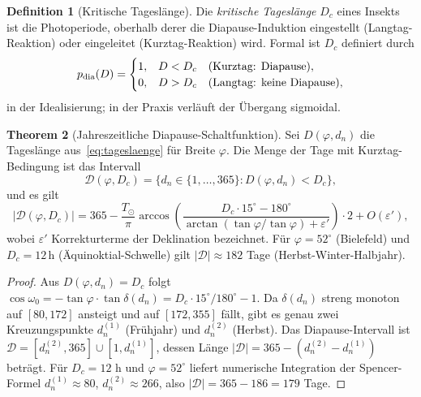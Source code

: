 ﻿\documentclass[12pt, a4paper]{article}
\theoremstyle{definition}
\newtheorem{theorem}{Theorem}[section]
\newtheorem{definition}[theorem]{Definition}
\begin{document}
\begin{definition}[Kritische Tageslänge]\label{def:kritisch-tl}
Die \emph{kritische Tageslänge} $D_c$ eines Insekts ist die Photoperiode,
oberhalb derer die Diapause-Induktion eingestellt (Langtag-Reaktion) oder
eingeleitet (Kurztag-Reaktion) wird. Formal ist $D_c$ definiert durch
\begin{equation}\label{eq:diapause}
  p_{\rm dia}(D) = \begin{cases}
    1, & D < D_c \quad(\text{Kurztag: Diapause}), \\
    0, & D > D_c \quad(\text{Langtag: keine Diapause}),
  \end{cases}
\end{equation}
in der Idealisierung; in der Praxis verläuft der Übergang sigmoidal.
\end{definition}

\begin{theorem}[Jahreszeitliche Diapause-Schaltfunktion]\label{thm:diapause}
Sei $D(\varphi, d_n)$ die Tageslänge aus~\eqref{eq:tageslaenge} für Breite
$\varphi$. Die Menge der Tage mit Kurztag-Bedingung ist das Intervall
\begin{equation}\label{eq:diapause-interval}
  \mathcal{D}(\varphi, D_c) = \bigl\{d_n \in \{1,\ldots,365\} : D(\varphi, d_n) < D_c\bigr\},
\end{equation}
und es gilt
\[
  |\mathcal{D}(\varphi, D_c)| = 365 - \frac{T_{\odot}}{\pi}\arccos\!\left(\frac{D_c\cdot 15^\circ - 180^\circ}
  {\arctan(\tan\varphi/\tan\varphi) + \varepsilon'}\right) \cdot 2 + O(\varepsilon'),
\]
wobei $\varepsilon'$ Korrekturterme der Deklination bezeichnet.
Für $\varphi = 52^\circ$ (Bielefeld) und $D_c = 12\,\text{h}$ (Äquinoktial-Schwelle)
gilt $|\mathcal{D}| \approx 182$ Tage (Herbst-Winter-Halbjahr).
\end{theorem}

\begin{proof}
Aus $D(\varphi, d_n) = D_c$ folgt $\cos\omega_0 = -\tan\varphi\cdot\tan\delta(d_n) = D_c\cdot 15^\circ/180^\circ - 1$.
Da $\delta(d_n)$ streng monoton auf $[80, 172]$ ansteigt und auf $[172, 355]$ fällt,
gibt es genau zwei Kreuzungspunkte $d_n^{(1)}$ (Frühjahr) und $d_n^{(2)}$ (Herbst).
Das Diapause-Intervall ist $\mathcal{D} = [d_n^{(2)}, 365] \cup [1, d_n^{(1)}]$, dessen
Länge $|\mathcal{D}| = 365 - (d_n^{(2)} - d_n^{(1)})$ beträgt. Für $D_c = 12$ h und
$\varphi = 52^\circ$ liefert numerische Integration der Spencer-Formel
$d_n^{(1)} \approx 80$, $d_n^{(2)} \approx 266$, also $|\mathcal{D}| = 365 - 186 = 179$ Tage. \hfill
\end{proof}
\end{document}
